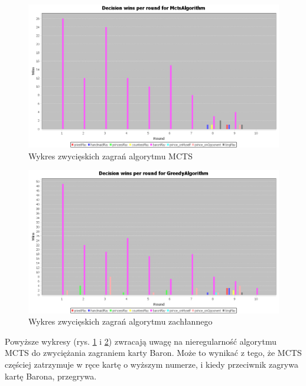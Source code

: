 \begin{figure}[H]
	\centering
	\includegraphics[width=\textwidth]{Resources/MirrorMctsVG/MctsVsGDecision.PNG}
	\caption{Wykres zwycięskich zagrań algorytmu MCTS} 
	\label{fig:MctsVsGDecision}
\end{figure} 

\begin{figure}[H]
	\centering
	\includegraphics[width=\textwidth]{Resources/MirrorMctsVG/GVsMctsDecision.PNG}
	\caption{Wykres zwycięskich zagrań algorytmu zachłannego} 
	\label{fig:GVsMctsDecision}
\end{figure} 

Powyższe wykresy (rys. \ref{fig:MctsVsGDecision} i \ref{fig:GVsMctsDecision}) zwracają uwagę na nieregularność algorytmu MCTS do zwyciężania zagraniem karty Baron. Może to wynikać z tego, że MCTS częściej zatrzymuje w ręce kartę o wyższym numerze, i kiedy przeciwnik zagrywa kartę Barona, przegrywa.

